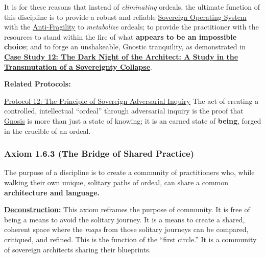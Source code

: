 \documentclass{article}
\begin{document}
\begin{nobullet}
    It is for these reasons that instead of \textit{eliminating} ordeals, the ultimate function of this discipline is to provide a robust and reliable \hyperlink{gloss:sovereign_operating_system}{Sovereign Operating System} with the \hyperlink{gloss:anti-fragility}{Anti-Fragility} to \textit{metabolize} ordeals; to provide the practitioner with the resources to stand within the fire of what \textbf{appears to be an impossible choice}; and to forge an unshakeable, Gnostic tranquility, as demonstrated in \textbf{\hyperref[case_study_12]{Case Study 12: The Dark Night of the Architect: A Study in the Transmutation of a \hyperlink{gloss:sovereignty_collapse}{Sovereignty Collapse}}}.

    \item \textbf{Related Protocols:}
        \begin{nobullet}
            \item \hyperref[protocol_12_the_principle_of_sovereign_adversarial_inquiry]{Protocol 12: The Principle of Sovereign Adversarial Inquiry} The act of creating a controlled, intellectual ``ordeal'' through adversarial inquiry is the proof that \hyperlink{gloss:gnosis}{Gnosis} is more than just a state of knowing; it is an earned state of \textbf{being}, forged in the crucible of an ordeal.
        \end{nobullet}
\end{nobullet}

\subsubsection*{Axiom 1.6.3 (The Bridge of Shared Practice)} \label{axiom_1_6_3_the_bridge_of_shared_practice}
The purpose of a discipline is to create a community of practitioners who, while walking their own unique, solitary paths of ordeal, can share a common \textbf{architecture and language.}
\begin{nobullet}
    \item \textbf{\hyperlink{gloss:deconstruction}{Deconstruction}:} This axiom reframes the purpose of community. It is free of being a means to avoid the solitary journey. It is a means to create a shared, coherent space where the \textit{maps} from those solitary journeys can be compared, critiqued, and refined. This is the function of the ``first circle.'' It is a community of sovereign architects sharing their blueprints.
\end{nobullet}
\end{document}
